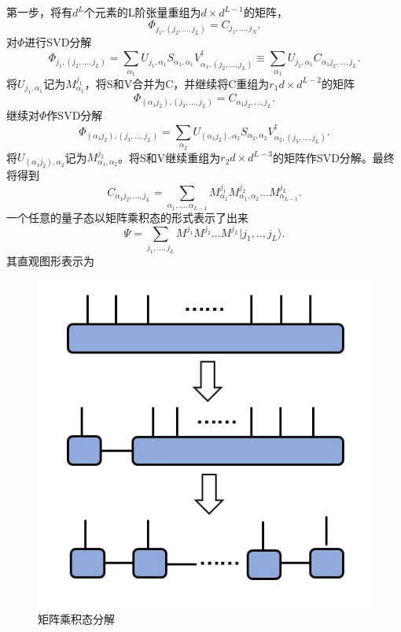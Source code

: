 \documentclass[12pt]{article}
\begin{document}
       第一步，将有$d^L$个元素的L阶张量重组为$d\times d^{L-1}$的矩阵，\begin{equation}\Phi_{j_1,(j_2,...,j_L)}=C_{j_1,...,j_N}.\end{equation}
       对$\Phi$进行SVD分解
       \begin{equation}\Phi_{j_1,(j_2,...,j_L)}=\sum_{\alpha_1}U_{j_1,\alpha_1}S_{\alpha_1,\alpha_1}V^\dagger_{\alpha_1,(j_2,...,j_L)}\equiv\sum_{\alpha_1}U_{j_1,\alpha_1}C_{\alpha_1j_2,...,j_L}.\end{equation}
       将$U_{j_1,\alpha_1}$记为$M_{\alpha_1}^{j_1}$，将S和V合并为C，并继续将C重组为$r_1d\times d^{L-2}$的矩阵
       \begin{equation}\Phi_{(\alpha_1j_2),(j_3,...,j_L)}=C_{\alpha_1j_2,...,j_L}.\end{equation}
       继续对$\Phi$作SVD分解
       \begin{equation}\Phi_{(\alpha_1j_2),(j_3,...,j_L)}=\sum_{\alpha_2}U_{(\alpha_1j_2),\alpha_2}S_{\alpha_2,\alpha_2}V^{\dagger}_{\alpha_2,(j_3,...,j_L)}.\end{equation}
       将$U_{(\alpha_1j_2),\alpha_2}$记为$M_{\alpha_1,\alpha_2}^{j_2}$。将S和V继续重组为$r_2d\times d^{L-3}$的矩阵作SVD分解。最终将得到
       \begin{equation}C_{\alpha_1j_2,...,j_L}=\sum_{\alpha_1,...,\alpha_{L-1}}M_{\alpha_1}^{j_1}M_{\alpha_1,\alpha_2}^{j_2}...M_{\alpha_{L-1}}^{j_L}.\end{equation}
       一个任意的量子态以矩阵乘积态的形式表示了出来
       \begin{equation}\Psi=\sum_{j_1,...,j_L}M^{j_1}M^{j_2}...M^{j_L}|j_1,..,j_L\rangle.\end{equation}
       其直观图形表示为
       \begin{figure}[H]
       	\centering
       	\includegraphics[scale=0.7]{4.矩阵乘积态分解}
       	\caption[9pt]{ 矩阵乘积态分解}
       	\label{fig:4}
       \end{figure}
       
\end{document}
